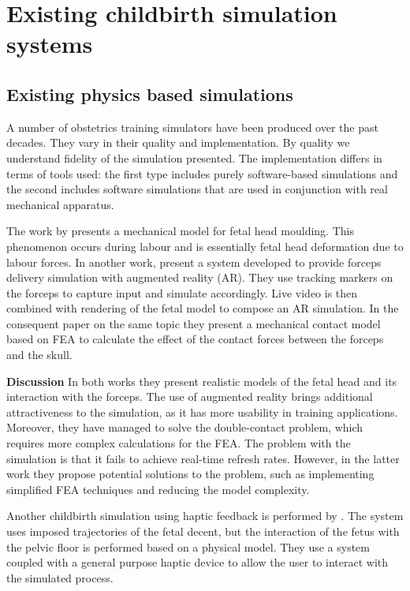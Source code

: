 \section{Existing childbirth simulation systems}\label{lit-existing}

\subsection{Existing physics based simulations}

A number of obstetrics training simulators have been produced over the past decades. They vary in their quality and implementation. By quality we understand fidelity of the simulation presented. The implementation differs in terms of tools used: the first type includes purely software-based simulations and the second includes software simulations that are used in conjunction with real mechanical apparatus.

The work by \textbf{\citet{RUDY2001}} presents a mechanical model for fetal head moulding. This phenomenon occurs during labour and is essentially fetal head deformation due to labour forces. In another work, \citet{RUDY2004} present a system developed to provide forceps delivery simulation with augmented reality (AR). They use tracking markers on the forceps to capture input and simulate accordingly. Live video is then combined with rendering of the fetal model to compose an AR simulation. In the consequent paper on the same topic they present a mechanical contact model based on FEA to calculate the effect of the contact forces between the forceps and the skull.

\textbf{Discussion} In both works they present realistic models of the fetal head and its interaction with the forceps. The use of augmented reality brings additional attractiveness to the simulation, as it has more usability in training applications. Moreover, they have managed to solve the double-contact problem, which requires more complex calculations for the FEA.
The problem with the simulation is that it fails to achieve real-time refresh rates. However, in the latter work they propose potential solutions to the problem, such as implementing simplified FEA techniques and reducing the model complexity.

Another childbirth simulation using haptic feedback is performed by \textbf{\citet{KheddarImposedTraj}}. The system uses imposed trajectories of the fetal decent, but the interaction of the fetus with the pelvic floor is performed based on a physical model. They use a system coupled with a general purpose haptic device to allow the user to interact with the simulated process.

